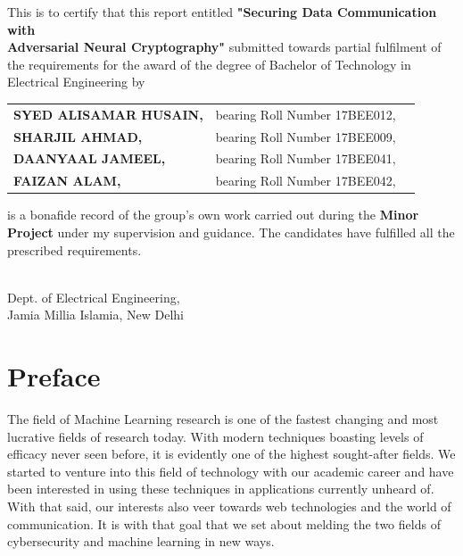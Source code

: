 \documentclass[a4paper]{article}
\begin{document}
  \noindent This is to certify that this report entitled {\bfseries "Securing Data Communication with\\ 
  Adversarial Neural Cryptography"} submitted towards partial fulfilment of the requirements for
  the award of the degree of Bachelor of Technology in Electrical Engineering by\\

  \begin{tabular}{l c c }
    {\bfseries SYED ALISAMAR HUSAIN,} & bearing Roll Number 17BEE012,\\
    {\bfseries SHARJIL AHMAD,} & bearing Roll Number 17BEE009,\\
    {\bfseries DAANYAAL JAMEEL,} & bearing Roll Number 17BEE041,\\
    {\bfseries FAIZAN ALAM,} & bearing Roll Number 17BEE042,\\
  \end{tabular} 
  \vspace*{0.125in}

  \noindent is a bonafide record of the group's own work carried out during the {\bfseries Minor Project} 
  under my supervision and guidance. The candidates have fulfilled all the prescribed requirements.
  
  \vspace*{1.5in}
  \\
  Dept. of Electrical Engineering,\\
  Jamia Millia Islamia, New Delhi
  \vspace*{\fill}
  \thispagestyle{empty}


  \newpage
  \vspace*{1in}
  \section*{Preface}
  The field of Machine Learning research is one of the fastest changing and most lucrative fields
  of research today. With modern techniques boasting levels of efficacy never seen before, it is
  evidently one of the highest sought-after fields. We started to venture into this field of technology
  with our academic career and have been interested in using these techniques in applications currently
  unheard of. With that said, our interests also veer towards web technologies and the world
  of communication. It is with that goal that we set about melding the two fields of cybersecurity
  and machine learning in new ways.
\end{document}

